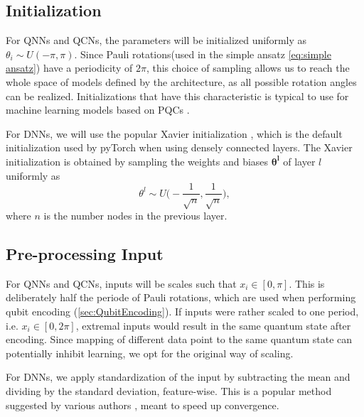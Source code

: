 \subsection{Initialization}\label{sec:Initialization}
For QNNs and QCNs, the parameters will be initialized uniformly as $\theta_i \sim U(-\pi, \pi)$. Since Pauli rotations(used in the simple ansatz \autoref{eq:simple ansatz}) have a periodicity of $2\pi$, this choice of sampling allows us to reach the whole space of models defined by the architecture, as all possible rotation angles can be realized. Initializations that have this characteristic is typical to use for machine learning models based on PQCs \cite{abbas2020power}\cite{skolik2020layerwise}.

For DNNs, we will use the popular Xavier initialization \cite{xavier}, which is the default initialization used by pyTorch\cite{pytorch} when using densely connected layers. The Xavier initialization is obtained by sampling the weights and biases $\boldsymbol{\theta^{l}}$ of layer $l$ uniformly as 
\begin{equation}
    \theta^{l} \sim U\big(-\frac{1}{\sqrt{n}},\frac{1}{\sqrt{n}}\big),
\end{equation}
where $n$ is the number nodes in the previous layer. 

\subsection{Pre-processing Input}\label{sec:Pre-processing Input}
For QNNs and QCNs, inputs will be scales such that $x_i \in [0, \pi]$. This is deliberately half the periode of Pauli rotations, which are used when performing qubit encoding (\autoref{sec:QubitEncoding}). If inputs were rather scaled to one period, i.e. $x_i \in [0, 2\pi]$, extremal inputs would result in the same quantum state after encoding. Since mapping of different data point to the same quantum state can potentially inhibit learning, we opt for the original way of scaling.

For DNNs, we apply standardization of the input by subtracting the mean and dividing by the standard deviation, feature-wise. This is a popular method suggested by various authors \cite{hands-on, LeCun2012}, meant to speed up convergence.

